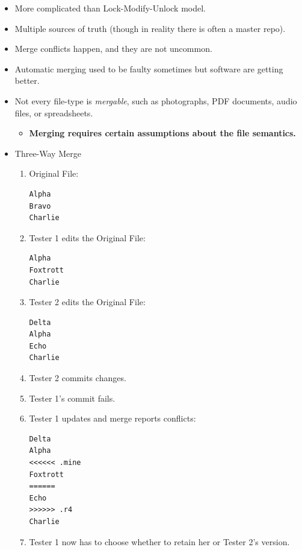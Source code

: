 \documentclass[a4paper]{article}
\providecommand{\tightlist}{%
  \setlength{\itemsep}{0pt}\setlength{\parskip}{0pt}}
\begin{document}
\begin{itemize}
\begin{itemize}
    \begin{itemize}
    \tightlist
    \item
      More complicated than Lock-Modify-Unlock model.
    \item
      Multiple sources of truth (though in reality there is often a
      master repo).
    \item
      Merge conflicts happen, and they are not uncommon.
    \item
      Automatic merging used to be faulty sometimes but software are
      getting better.
    \item
      Not every file-type is \emph{mergable}, such as photographs, PDF
      documents, audio files, or spreadsheets.

      \begin{itemize}
      \tightlist
      \item
        \textbf{Merging requires certain assumptions about the file
        semantics.}
      \end{itemize}
    \end{itemize}
  \end{itemize}
\end{itemize}



\begin{itemize}
\item
  Three-Way Merge

  \begin{enumerate}
  \def\labelenumi{\arabic{enumi}.}
  \item
    Original File:

\begin{verbatim}
Alpha
Bravo
Charlie
\end{verbatim}
  \item
    Tester 1 edits the Original File:

\begin{verbatim}
Alpha
Foxtrott
Charlie
\end{verbatim}
  \item
    Tester 2 edits the Original File:

\begin{verbatim}
Delta
Alpha
Echo
Charlie
\end{verbatim}
  \item
    Tester 2 commits changes.
  \item
    Tester 1's commit fails.
  \item
    Tester 1 updates and merge reports conflicts:

\begin{verbatim}
Delta
Alpha
<<<<<< .mine
Foxtrott
======
Echo
>>>>>> .r4
Charlie
\end{verbatim}
  \item
    Tester 1 now has to choose whether to retain her or Tester 2's
    version.
  \end{enumerate}
\end{itemize}
\end{document}
